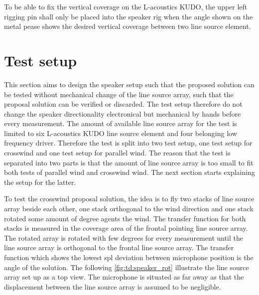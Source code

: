 
To be able to fix the vertical coverage on the L-acoustics KUDO, the upper left rigging pin shall only be placed into the speaker rig when the angle shown on the metal pease shows the desired vertical coverage between two line source element.  




\section{Test setup}\label{sec:pro:test_setup}
This section aims to design the speaker setup such that the proposed solution can be tested without mechanical change of the line source array, such that the proposal solution can be verified or discarded. The test setup therefore do not change the speaker directionality electronical but mechanical by hands before every measurement. The amount of available line source array for the test is limited to six L-acoustics KUDO line source element and four belonging low frequency driver. Therefore the test is split into two test setup, one test setup for crosswind and one test setup for parallel wind. The reason that the test is separated into two parts is that the amount of line source array is too small to fit both tests of parallel wind and crosswind wind. The next section starts explaining the setup for the latter.

To test the crosswind proposal solution, the idea is to fly two stacks of line source array beside each other, one stack orthogonal to the wind direction and one stack rotated some amount of degree agents the wind. The transfer function for both stacks is measured in the coverage area of the frontal pointing line source array. The rotated array is rotated with few degrees for every measurement until the line source array is orthogonal to the frontal line source array. The transfer function which shows the lowest \gls{spl} deviation between microphone position is the angle of the solution. The following \autoref{fig:td:speaker_rot} illustrate the line source array set up as a top view. The microphone is situated as far away as that the displacement between the line source array is assumed to be negligible.


